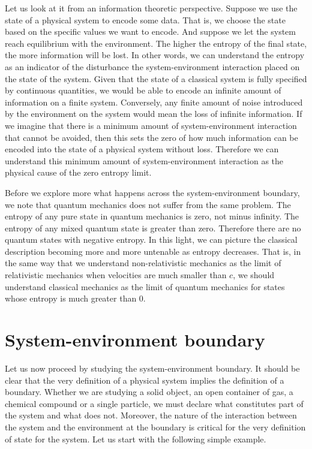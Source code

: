 \documentclass[10pt,twocolumn, nofootinbib]{revtex4-2}
\begin{document}
Let us look at it from an information theoretic perspective. Suppose we use the state of a physical system to encode some data. That is, we choose the state based on the specific values we want to encode. And suppose we let the system reach equilibrium with the environment. The higher the entropy of the final state, the more information will be lost. In other words, we can understand the entropy as an indicator of the disturbance the system-environment interaction placed on the state of the system. Given that the state of a classical system is fully specified by continuous quantities, we would be able to encode an infinite amount of information on a finite system. Conversely, any finite amount of noise introduced by the environment on the system would mean the loss of infinite information. If we imagine that there is a minimum amount of system-environment interaction that cannot be avoided, then this sets the zero of how much information can be encoded into the state of a physical system without loss. Therefore we can understand this minimum amount of system-environment interaction as the physical cause of the zero entropy limit.

Before we explore more what happens across the system-environment boundary, we note that quantum mechanics does not suffer from the same problem. The entropy of any pure state in quantum mechanics is zero, not minus infinity. The entropy of any mixed quantum state is greater than zero. Therefore there are no quantum states with negative entropy. In this light, we can picture the classical description becoming more and more untenable as entropy decreases. That is, in the same way that we understand non-relativistic mechanics as the limit of relativistic mechanics when velocities are much smaller than $c$, we should understand classical mechanics as the limit of quantum mechanics for states whose entropy is much greater than $0$.

\section{System-environment boundary}

Let us now proceed by studying the system-environment boundary. It should be clear that the very definition of a physical system implies the definition of a boundary. Whether we are studying a solid object, an open container of gas, a chemical compound or a single particle, we must declare what constitutes part of the system and what does not. Moreover, the nature of the interaction between the system and the environment at the boundary is critical for the very definition of state for the system. Let us start with the following simple example.
\end{document}

